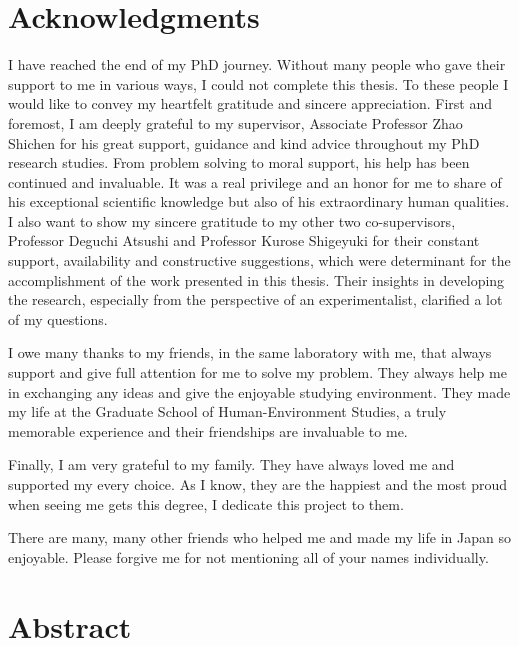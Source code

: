 \documentclass[12pt, twoside, a4paper]{book} %
\begin{document}
\chapter{Acknowledgments}
%
I have reached the end of my PhD journey. Without many people who gave their support to me in various ways, I could not complete this thesis. To these people I would like to convey my heartfelt gratitude and sincere appreciation. 
%
First and foremost, I am deeply grateful to my supervisor, Associate Professor Zhao Shichen for his great support, guidance and kind advice throughout my PhD research studies. From problem solving to moral support, his help has been continued and invaluable. It was a real privilege and an honor for me to share of his exceptional scientific knowledge but also of his extraordinary human qualities.
I also want to show my sincere gratitude to my other two co-supervisors, Professor Deguchi Atsushi and Professor Kurose Shigeyuki for their constant support, availability and constructive suggestions, which were determinant for the accomplishment of the work presented in this thesis. Their insights in developing the research, especially from the perspective of an experimentalist, clarified a lot of my questions.

%
I owe many thanks to my friends, in the same laboratory with me, that always support and give full attention for me to solve my problem. They always help me in exchanging any ideas and give the enjoyable studying environment. They made my life at the Graduate School of Human-Environment Studies, a truly memorable experience and their friendships are invaluable to me.

%
Finally, I am very grateful to my family. They have always loved me and supported my every choice. As I know, they are the happiest and the most proud when seeing me gets this degree, I dedicate this project to them. 

%
There are many, many other friends who helped me and made my life in Japan so enjoyable. Please forgive me for not mentioning all of your names individually.

\chapter{Abstract}
\end{document}
